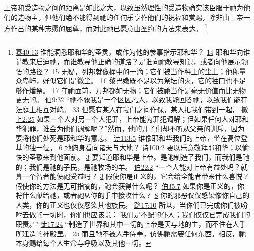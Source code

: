 \documentclass[12pt, a4paper, oneside]{ctexart}
\newcounter{parnum}[section]
\newcommand{\N}{%
   \noindent\refstepcounter{parnum}%
    \makebox[\parindent][l]{\textbf{\arabic{parnum}.}}}
\begin{document}
\N 上帝和受造物之间的距离是如此之大，以致虽然理性的受造物确实该臣服于祂为他们的造物主，但他们绝不能得到祂的任何乐享作他们的祝福和赏赐，除非由上帝一方作出的某种志愿的屈尊，而对此祂已愿意由圣约的方法来表达。
	\footnote {
		\href{https://biblehub.com/isaiah/40-13.htm}{赛40:13} 谁能洞悉耶和华的圣灵，或作为他的参事指示耶和华？
		\href{https://biblehub.com/isaiah/40-14.htm}{14} 耶和华向谁请教来启迪祂，而谁教导他正确的道路？是谁向祂教导知识，或者向他展示领悟的路径？
		\href{https://biblehub.com/isaiah/40-15.htm}{15} 无疑，列邦就像桶中的一滴；它们被当作秤上的尘土；他称量众岛屿，好似它们是微尘。
		\href{https://biblehub.com/isaiah/40-16.htm}{16} 黎巴嫩既不足以为祭坛的火，它的牲口也不足够作燔祭。
		\href{https://biblehub.com/isaiah/40-17.htm}{17} 在祂面前，万邦都如无物；它们被祂当作是毫无价值而比无物更无的。
		\href{https://biblehub.com/job/9-32.htm}{伯9:32} “祂不像我是一个区区凡人，以致我能回答祂，以致我们能在法庭上相互对峙。
		\href{https://biblehub.com/job/9-33.htm}{33} 但愿有某人在我们之间作保，某人把我们带到一起，
		\href{https://biblehub.com/1_samuel/2-25.htm}{撒上2:25} 如果一个人对另一个人犯罪，上帝能为罪犯调解；但如果任何人对耶和华犯罪，谁会为他们调解呢？”然而，他的儿子们却不听从父亲的训斥，因为要将他们处死是耶和华的意志。
		\href{https://biblehub.com/psalms/113-5.htm}{诗113:5} 谁像耶和华我们的上帝，坐在高位登基的独一位，
		\href{https://biblehub.com/psalms/113-6.htm}{6} 祂俯身看向诸天与大地？
		\href{https://biblehub.com/psalms/100-2.htm}{诗100:2} 要以乐意敬拜耶和华；以愉快的圣歌来到他面前。
		\href{https://biblehub.com/psalms/100-3.htm}{3} 要知道耶和华是上帝。是祂制造了我们，而我们是祂的；我们是祂的子民，是祂牧场的羊。
		\href{https://biblehub.com/job/22-2.htm}{伯22:2} “一个人能对上帝有益处吗？就算一个智者能使祂受益吗？
		\href{https://biblehub.com/job/22-3.htm}{3} 假使你是正义的，它会给全能者带来什么喜悦？假使你的方法是无可指摘的，祂会获得什么呢？
		\href{https://biblehub.com/job/35-7.htm}{伯35:7} 如果你是正义的，你将什么献给祂，或者祂从你的手中接收什么？
		\href{https://biblehub.com/job/35-8.htm}{8} 你的邪恶仅仅感染像你自己的人类，你的正义也仅仅感染其他族民。
		\href{https://biblehub.com/luke/17-10.htm}{路17:10} 所以，当你们已完成你们被吩咐去做的一切时，你们也应该说：‘我们是不配的仆人；我们仅仅已完成我们的职责。’”
		\href{https://biblehub.com/acts/17-24.htm}{徒17:24} “制造了世界和其中一切的上帝是天与地的主，而不住在人手所建造的神殿里。
		\href{https://biblehub.com/acts/17-25.htm}{25} 而且祂不被人手侍奉，仿佛祂需要任何东西。相反，祂本身赐给每个人生命与呼吸以及其他一切。
	}
\end{document}
